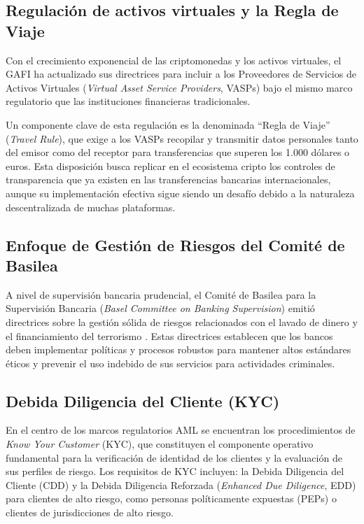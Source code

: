 \subsection{Regulación de activos virtuales y la Regla de Viaje}

Con el crecimiento exponencial de las criptomonedas y los activos virtuales, el GAFI ha actualizado sus directrices para incluir a los Proveedores de Servicios de Activos Virtuales (\textit{Virtual Asset Service Providers}, VASPs) bajo el mismo marco regulatorio que las instituciones financieras tradicionales. 

Un componente clave de esta regulación es la denominada ``Regla de Viaje'' (\textit{Travel Rule}), que exige a los VASPs recopilar y transmitir datos personales tanto del emisor como del receptor para transferencias que superen los 1.000 dólares o euros. Esta disposición busca replicar en el ecosistema cripto los controles de transparencia que ya existen en las transferencias bancarias internacionales, aunque su implementación efectiva sigue siendo un desafío debido a la naturaleza descentralizada de muchas plataformas.

\subsection{Enfoque de Gestión de Riesgos del Comité de Basilea}

A nivel de supervisión bancaria prudencial, el Comité de Basilea para la Supervisión Bancaria (\textit{Basel Committee on Banking Supervision}) emitió directrices sobre la gestión sólida de riesgos relacionados con el lavado de dinero y el financiamiento del terrorismo \cite{BaselCommitteeonBankingSupervision2020SoundTerrorism}. Estas directrices establecen que los bancos deben implementar políticas y procesos robustos para mantener altos estándares éticos y prevenir el uso indebido de sus servicios para actividades criminales.

\subsection{Debida Diligencia del Cliente (KYC)}

En el centro de los marcos regulatorios AML se encuentran los procedimientos de \textit{Know Your Customer} (KYC), que constituyen el componente operativo fundamental para la verificación de identidad de los clientes y la evaluación de sus perfiles de riesgo. Los requisitos de KYC incluyen: la Debida Diligencia del Cliente (CDD) y la Debida Diligencia Reforzada (\textit{Enhanced Due Diligence}, EDD) para clientes de alto riesgo, como personas políticamente expuestas (PEPs) o clientes de jurisdicciones de alto riesgo.

